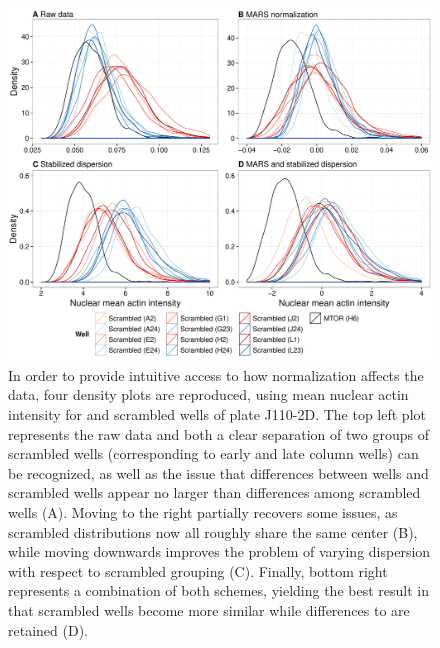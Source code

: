 \begin{knitrout}
\color{fgcolor}\begin{figure}

{\centering \includegraphics[width=\maxwidth]{figures/R/normalization-data-actin-normalization-1} 

}

\caption[Effects of normalization schemes visualized through density plots.]{In order to provide intuitive access to how normalization affects the data, four density plots are reproduced, using mean nuclear actin intensity for  and scrambled wells of plate J110-2D. The top left plot represents the raw data and both a clear separation of two groups of scrambled wells (corresponding to early and late column wells) can be recognized, as well as the issue that differences between  wells and scrambled wells appear no larger than differences among scrambled wells (A). Moving to the right partially recovers some issues, as scrambled distributions now all roughly share the same center (B), while moving downwards improves the problem of varying dispersion with respect to scrambled grouping (C). Finally, bottom right represents a combination of both schemes, yielding the best result in that scrambled wells become more similar while differences to  are retained (D).}\label{fig:data-actin-normalization}
\end{figure}


\end{knitrout}
